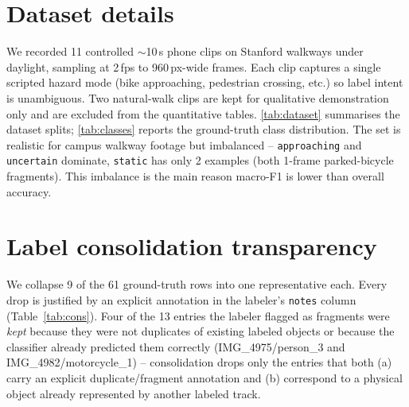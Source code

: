 \documentclass[10pt,twocolumn,letterpaper]{article}
\begin{document}
\section{Dataset details}
\label{app:dataset}
We recorded 11 controlled $\sim$10\,s phone clips on Stanford walkways
under daylight, sampling at 2\,fps to 960\,px-wide frames. Each clip
captures a single scripted hazard mode (bike approaching, pedestrian
crossing, etc.) so label intent is unambiguous. Two natural-walk
clips are kept for qualitative demonstration only and are excluded
from the quantitative tables. \cref{tab:dataset} summarises the dataset
splits; \cref{tab:classes} reports the ground-truth class
distribution. The set is realistic for campus walkway footage but
imbalanced -- \texttt{approaching} and \texttt{uncertain} dominate,
\texttt{static} has only 2 examples (both 1-frame parked-bicycle
fragments). This imbalance is the main reason macro-F1 is lower than
overall accuracy.

\begin{table}[h]
  \centering\footnotesize
  \caption{Dataset summary. 11 controlled videos contribute the 61
  manually-labelled tracks; 4 labels are absorbed by post-tracker
  re-ID, leaving 57 prediction/label pairs (raw denominator) and 30
  tracks for the decidable subset ($\ge\!3$ frames).}
  \label{tab:dataset}
  
\end{table}

\begin{table}[h]
  \centering\scriptsize
  \caption{Ground-truth class distribution. The set is imbalanced:
  \texttt{approaching} dominates; \texttt{static} and
  \texttt{crossing\_RTL} have $n\!\le\!3$.}
  \label{tab:classes}
  \resizebox{\linewidth}{!}{}
\end{table}

\section{Label consolidation transparency}
\label{app:cons}
We collapse 9 of the 61 ground-truth rows into one representative
each. Every drop is justified by an explicit annotation in the
labeler's \texttt{notes} column (Table~\ref{tab:cons}). Four of the
13 entries the labeler flagged as fragments were \emph{kept} because
they were not duplicates of existing labeled objects or because the
classifier already predicted them correctly (IMG\_4975/person\_3 and
IMG\_4982/motorcycle\_1) -- consolidation drops only the entries that
both (a) carry an explicit duplicate/fragment annotation and (b)
correspond to a physical object already represented by another
labeled track.
\end{document}

